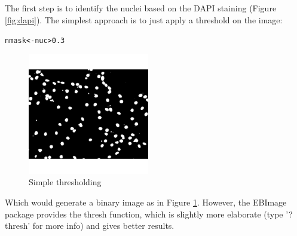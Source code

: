 \documentclass{article}\usepackage[]{graphicx}\usepackage[]{color}
\makeatletter
\newcommand{\hlnum}[1]{\textcolor[rgb]{0.686,0.059,0.569}{#1}}%
\newcommand{\hlopt}[1]{\textcolor[rgb]{0,0,0}{#1}}%
\newcommand{\hlstd}[1]{\textcolor[rgb]{0.345,0.345,0.345}{#1}}%
\newcommand{\hlkwb}[1]{\textcolor[rgb]{0.69,0.353,0.396}{#1}}%
\newenvironment{kframe}{%
 \def\at@end@of@kframe{}%
 \ifinner\ifhmode%
  \def\at@end@of@kframe{\end{minipage}}%
  \begin{minipage}{\columnwidth}%
 \fi\fi%
 \def\FrameCommand##1{\hskip\@totalleftmargin \hskip-\fboxsep
 \colorbox{shadecolor}{##1}\hskip-\fboxsep
     \hskip-\linewidth \hskip-\@totalleftmargin \hskip\columnwidth}%
 \MakeFramed {\advance\hsize-\width
   \@totalleftmargin\z@ \linewidth\hsize
   \@setminipage}}%
 {\par\unskip\endMakeFramed%
 \at@end@of@kframe}
\newenvironment{knitrout}{}{} %
\makeatother
\begin{document}
The first step is to identify the nuclei based on the DAPI staining (Figure \ref{fig:dapi}).
The simplest approach is to just apply a threshold on the image:
\begin{knitrout}
\color{fgcolor}\begin{kframe}
\begin{alltt}
\hlstd{nmask} \hlkwb{<-} \hlstd{nuc} \hlopt{>} \hlnum{0.3}
\end{alltt}
\end{kframe}\begin{figure}[]


{\centering \includegraphics[width=200px]{knit_figure/figsimp_thr} 

}

\caption[Simple thresholding]{Simple thresholding\label{fig:simp.thr}}
\end{figure}


\end{knitrout}

Which would generate a binary image as in Figure \ref{fig:simp.thr}.
However, the EBImage package provides the thresh function, which is slightly more elaborate (type '?thresh' for more info) and gives better results.
\end{document}
